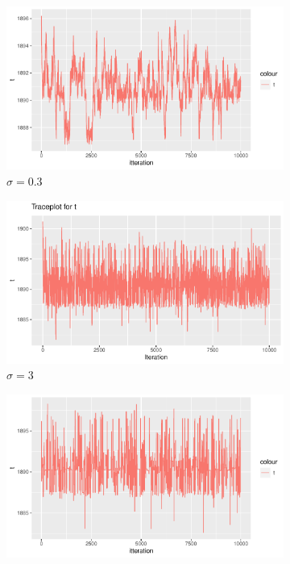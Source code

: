 \begin{figure}[h]
    \centering
    \begin{subfigure}[b]{0.49\textwidth}
        \centering
        \includegraphics[width = \textwidth]{Images/sim_t_sigma_03.pdf}
        \caption{$\sigma = 0.3$}
        \label{fig:tuning_single_03}
    \end{subfigure}
    \begin{subfigure}[b]{0.49\textwidth}
        \centering
        \includegraphics[width = \textwidth]{Images/sim_t.pdf}
        \caption{$\sigma = 3$}
        \label{fig:tuning_single_3}
    \end{subfigure}
    \begin{subfigure}[b]{0.49\textwidth}
        \centering
        \includegraphics[width = \textwidth]{Images/sim_t_sigma_15.pdf}

\end{subfigure}
\end{figure}
